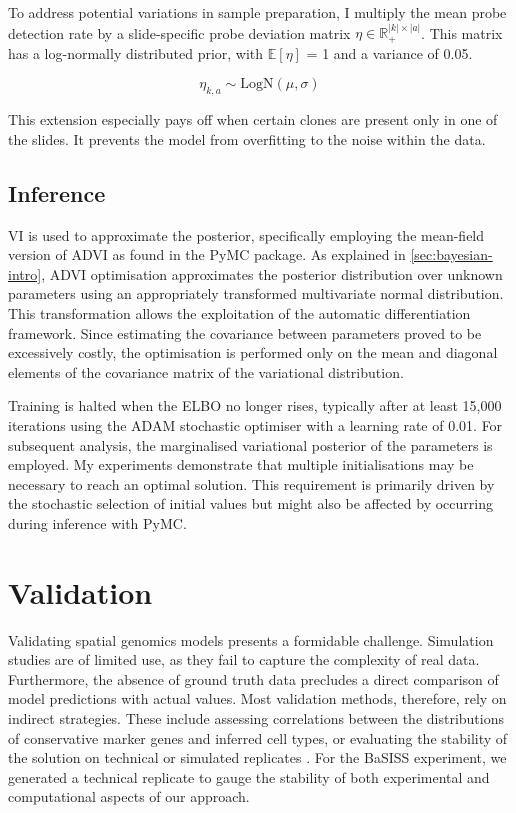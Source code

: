 To address potential variations in sample preparation, I multiply the mean probe detection rate by a slide-specific probe deviation matrix $\eta \in \mathbb{R}_{+}^{|k|\times|a|}$. This matrix has a log-normally distributed prior, with $\mathbb{E}[{\eta}]$ = 1 and a variance of 0.05.

\begin{equation} 
\eta_{k,a} \sim \text{LogN}(\mu, \sigma)
\end{equation}

This extension especially pays off when certain clones are present only in one of the slides. It prevents the model from overfitting to the noise within the data.

\subsection{Inference}
\label{sec:inference}
\acl{VI} is used to approximate the posterior, specifically employing the mean-field version of \ac{ADVI} as found in the \ac{PyMC} package. As explained in \cref{sec:bayesian-intro}, \ac{ADVI} optimisation approximates the posterior distribution over unknown parameters using an appropriately transformed multivariate normal distribution. This transformation allows the exploitation of the automatic differentiation framework. Since estimating the covariance between parameters proved to be excessively costly, the optimisation is performed only on the mean and diagonal elements of the covariance matrix of the variational distribution.

Training is halted when the \ac{ELBO} no longer rises, typically after at least 15,000 iterations using the ADAM stochastic optimiser \parencite{Kingma2014-um} with a learning rate of 0.01. For subsequent analysis, the marginalised variational posterior of the parameters is employed. My experiments demonstrate that multiple initialisations may be necessary to reach an optimal solution. This requirement is primarily driven by the stochastic selection of initial values but might also be affected by  occurring during inference with \ac{PyMC}.

\section{Validation}
\label{sec:bassis-validation}
Validating spatial genomics models presents a formidable challenge. Simulation studies are of limited use, as they fail to capture the complexity of real data. Furthermore, the absence of ground truth data precludes a direct comparison of model predictions with actual values. Most validation methods, therefore, rely on indirect strategies. These include assessing correlations between the distributions of conservative marker genes and inferred cell types, or evaluating the stability of the solution on technical or simulated replicates \parencite{Li2023-ik}. For the \ac{BaSISS} experiment, we generated a technical replicate to gauge the stability of both experimental and computational aspects of our approach.

